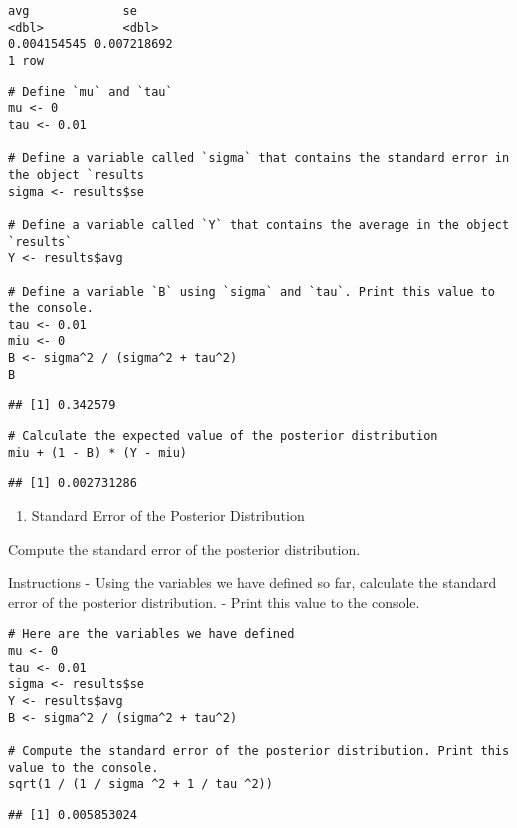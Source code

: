 \documentclass[
]{article}
\providecommand{\tightlist}{%
  \setlength{\itemsep}{0pt}\setlength{\parskip}{0pt}}
\begin{document}
\begin{verbatim}
avg             se
<dbl>           <dbl>
0.004154545 0.007218692
1 row
\end{verbatim}

\begin{verbatim}
# Define `mu` and `tau`
mu <- 0
tau <- 0.01

# Define a variable called `sigma` that contains the standard error in the object `results
sigma <- results$se

# Define a variable called `Y` that contains the average in the object `results`
Y <- results$avg

# Define a variable `B` using `sigma` and `tau`. Print this value to the console.
tau <- 0.01
miu <- 0
B <- sigma^2 / (sigma^2 + tau^2)
B
\end{verbatim}

\begin{verbatim}
## [1] 0.342579
\end{verbatim}

\begin{verbatim}
# Calculate the expected value of the posterior distribution
miu + (1 - B) * (Y - miu)
\end{verbatim}

\begin{verbatim}
## [1] 0.002731286
\end{verbatim}

\begin{enumerate}
\def\labelenumi{\arabic{enumi}.}
\setcounter{enumi}{8}
\tightlist
\item
  Standard Error of the Posterior Distribution
\end{enumerate}

Compute the standard error of the posterior distribution.

Instructions - Using the variables we have defined so far, calculate the
standard error of the posterior distribution. - Print this value to the
console.

\begin{verbatim}
# Here are the variables we have defined
mu <- 0
tau <- 0.01
sigma <- results$se
Y <- results$avg
B <- sigma^2 / (sigma^2 + tau^2)

# Compute the standard error of the posterior distribution. Print this value to the console.
sqrt(1 / (1 / sigma ^2 + 1 / tau ^2))
\end{verbatim}

\begin{verbatim}
## [1] 0.005853024
\end{verbatim}
\end{document}
